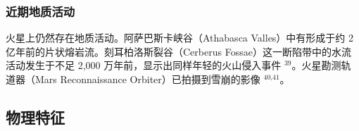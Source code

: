 \subsubsection{近期地质活动}
火星上仍然存在地质活动。阿萨巴斯卡峡谷（Athabasca Valles）中有形成于约 2 亿年前的片状熔岩流。刻耳柏洛斯裂谷（Cerberus Fossae）这一断陷带中的水流活动发生于不足 2,000 万年前，显示出同样年轻的火山侵入事件 \(^{\text{39}}\)。火星勘测轨道器（Mars Reconnaissance Orbiter）已拍摄到雪崩的影像 \(^{\text{40,41}}\)。
\subsection{物理特征}